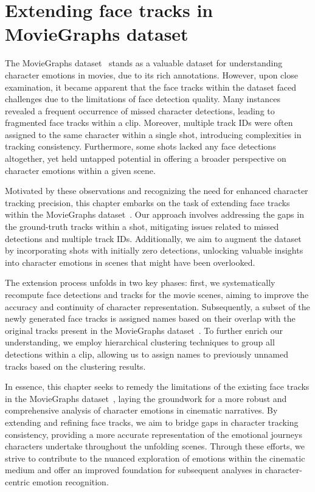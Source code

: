 \chapter{Extending face tracks in MovieGraphs dataset}
\label{ch:char_track_extension}
The MovieGraphs dataset~\cite{moviegraphs} stands as a valuable dataset for understanding character emotions in movies, due to its rich annotations. However, upon close examination, it became apparent that the face tracks within the dataset faced challenges due to the limitations of face detection quality. Many instances revealed a frequent occurrence of missed character detections, leading to fragmented face tracks within a clip. Moreover, multiple track IDs were often assigned to the same character within a single shot, introducing complexities in tracking consistency. Furthermore, some shots lacked any face detections altogether, yet held untapped potential in offering a broader perspective on character emotions within a given scene.

Motivated by these observations and recognizing the need for enhanced character tracking precision, this chapter embarks on the task of extending face tracks within the MovieGraphs dataset~\cite{moviegraphs}. Our approach involves addressing the gaps in the ground-truth tracks within a shot, mitigating issues related to missed detections and multiple track IDs. Additionally, we aim to augment the dataset by incorporating shots with initially zero detections, unlocking valuable insights into character emotions in scenes that might have been overlooked.

The extension process unfolds in two key phases: first, we systematically recompute face detections and tracks for the movie scenes, aiming to improve the accuracy and continuity of character representation. Subsequently, a subset of the newly generated face tracks is assigned names based on their overlap with the original tracks present in the MovieGraphs dataset~\cite{moviegraphs}. To further enrich our understanding, we employ hierarchical clustering techniques to group all detections within a clip, allowing us to assign names to previously unnamed tracks based on the clustering results.

In essence, this chapter seeks to remedy the limitations of the existing face tracks in the MovieGraphs dataset~\cite{moviegraphs}, laying the groundwork for a more robust and comprehensive analysis of character emotions in cinematic narratives. By extending and refining face tracks, we aim to bridge gaps in character tracking consistency, providing a more accurate representation of the emotional journeys characters undertake throughout the unfolding scenes. Through these efforts, we strive to contribute to the nuanced exploration of emotions within the cinematic medium and offer an improved foundation for subsequent analyses in character-centric emotion recognition.

